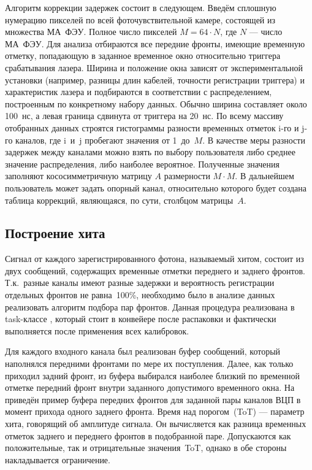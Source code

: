 Алгоритм коррекции задержек состоит в следующем. Введём сплошную нумерацию пикселей по всей фоточувствительной камере, состоящей из множества МА~ФЭУ. Полное число пикселей $ M = 64 \cdot N $, где $N$ --- число МА~ФЭУ. Для анализа отбираются все передние фронты, имеющие временную отметку, попадающую в заданное временное окно относительно триггера срабатывания лазера. Ширина и положение окна зависят от экспериментальной установки (например, разницы длин кабелей, точности регистрации триггера) и характеристик лазера и подбираются в соответствии с распределением, построенным по конкретному набору данных. Обычно ширина составляет около 100~нс, а левая граница сдвинута от триггера на 20~нс. По всему массиву отобранных данных строятся гистограммы разности временных отметок i-го и j-го каналов, где i~и~j пробегают значения от 1~до~$M$. В качестве меры разности задержек между каналами можно взять по выбору пользователя либо среднее значение распределения, либо наиболее вероятное. Полученные значения заполняют кососимметричную матрицу $A$ размерности $ M \cdot M $. В дальнейшем пользователь может задать опорный канал, относительно которого будет создана таблица коррекций, являющаяся, по сути, столбцом матрицы~$A$.

\subsection{Построение хита}

Сигнал от каждого зарегистрированного фотона, называемый хитом, состоит из двух сообщений, содержащих временные отметки переднего и заднего фронтов. Т.к.~разные каналы имеют разные задержки и вероятность регистрации отдельных фронтов не равна~100\%, необходимо было в анализе данных реализовать алгоритм подбора пар фронтов. Данная процедура реализована в task-классе , который стоит в конвейере после распаковки и фактически выполняется после применения всех калибровок.

Для каждого входного канала был реализован буфер сообщений, который наполнялся передними фронтами по мере их поступления. Далее, как только приходил задний фронт, из буфера выбирался наиболее близкий по временной отметке передний фронт внутри заданного допустимого временного окна. На  приведён пример буфера передних фронтов для заданной пары каналов ВЦП в момент прихода одного заднего фронта. Время над порогом~(ToT) --- параметр хита, говорящий об амплитуде сигнала. Он вычисляется как разница временных отметок заднего и переднего фронтов в подобранной паре. Допускаются как положительные, так и отрицательные значения~ToT, однако в обе стороны накладывается ограничение.

